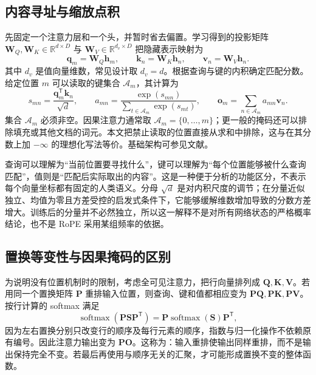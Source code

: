 \documentclass[UTF8,12pt,a4paper,fontset=fandol]{ctexart}
\begin{document}
\subsection{内容寻址与缩放点积}
先固定一个注意力层和一个头，并暂时省去偏置。学习得到的投影矩阵 $\mathbf W_Q,\mathbf W_K\in\mathbb R^{d\times D}$ 与 $\mathbf W_V\in\mathbb R^{d_v\times D}$ 把隐藏表示映射为
\begin{equation}
\mathbf q_m=\mathbf W_Q\mathbf h_m,\qquad
\mathbf k_n=\mathbf W_K\mathbf h_n,\qquad
\mathbf v_n=\mathbf W_V\mathbf h_n.
\label{eq:rope-qkv}
\end{equation}
其中 $d_v$ 是值向量维数，常见设计取 $d_v=d$。根据查询与键的内积确定匹配分数。给定位置 $m$ 可以读取的键集合 $\mathcal A_m$，其计算为
\begin{equation}
s_{mn}=\frac{\mathbf q_m^{\mathsf T}\mathbf k_n}{\sqrt d},\qquad
a_{mn}=\frac{\exp(s_{mn})}{\sum_{t\in\mathcal A_m}\exp(s_{mt})},\qquad
\mathbf o_m=\sum_{n\in\mathcal A_m}a_{mn}\mathbf v_n.
\label{eq:rope-attention}
\end{equation}
集合 $\mathcal A_m$ 必须非空。因果注意力通常取 $\mathcal A_m=\{0,\ldots,m\}$；更一般的掩码还可以排除填充或其他文档的词元。本文把禁止读取的位置直接从求和中排除，这与在其分数上加 $-\infty$ 的理想化写法等价。基础架构可参见文献\cite{vaswani2017}。

查询可以理解为“当前位置要寻找什么”，键可以理解为“每个位置能够被什么查询匹配”，值则是“匹配后实际取出的内容”。这是一种便于分析的功能区分，不表示每个向量坐标都有固定的人类语义。分母 $\sqrt d$ 是对内积尺度的调节；在分量近似独立、均值为零且方差受控的启发式条件下，它能够缓解维数增加导致的分数方差增大。训练后的分量并不必然独立，所以这一解释不是对所有网络状态的严格概率结论，也不是 RoPE 采用某组频率的依据。

\subsection{置换等变性与因果掩码的区别}
为说明没有位置机制时的限制，考虑全可见注意力，把行向量排列成 $\mathbf Q,\mathbf K,\mathbf V$。若用同一个置换矩阵 $\mathbf P$ 重排输入位置，则查询、键和值都相应变为 $\mathbf P\mathbf Q,\mathbf P\mathbf K,\mathbf P\mathbf V$。按行计算的 softmax 满足
\[
\operatorname{softmax}(\mathbf P\mathbf S\mathbf P^{\mathsf T})
=\mathbf P\operatorname{softmax}(\mathbf S)\mathbf P^{\mathsf T},
\]
因为左右置换分别只改变行的顺序及每行元素的顺序，指数与归一化操作不依赖原有编号。因此注意力输出变为 $\mathbf P\mathbf O$。这称为：输入重排使输出同样重排，而不是输出保持完全不变。若最后再使用与顺序无关的汇聚，才可能形成置换不变的整体函数。
\end{document}
